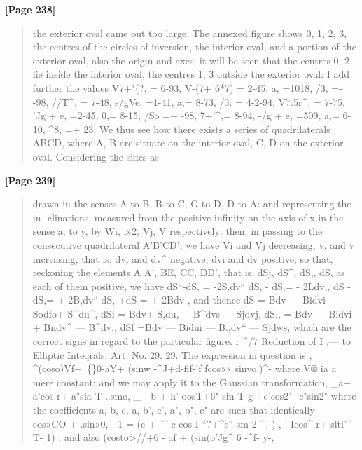 \documentclass[11pt,a4paper]{book}
\begin{document}
\textbf{[Page 238]}\\[0.2cm]
\begin{quote}
the exterior oval came out too large. The annexed figure shows 0, 1, 2, 3, the
centres of the circles of inversion, the interior oval, and a portion of the exterior
oval, also the origin and axes; it will be seen that the centres 0, 2 lie inside the
interior oval, the centres 1, 3 outside the exterior oval: I add further the values
V7+"(?, = 6-93, V-(7+ 6*7) = 2-45, a, =1018, /3, =- -98,
//T\textasciicircum{}, = 7-48, s/gVe, =1-41, a,= 8-73, /3: = 4-2-94,
V7:5r\textasciicircum{}. = 7-75, 'Jg + e, =2-45, 0,= 8-15, /So =+ -98,
7+'\textasciicircum{},= 8-94, -/g + e, =509, a,= 6-10, \textasciicircum{}8, =+ 23.
We thus see how there exists a series of quadrilaterals ABCD, where A, B are
situate on the interior oval, C, D on the exterior oval. Considering the sides as
\end{quote}

\textbf{[Page 239]}\\[0.2cm]
\begin{quote}
drawn in the senses A to B, B to C, G to D, D to A: and representing the in-
clinations, measured from the positive infinity on the axis of x in the sense a; to y,
by Wi, i»2, Vj, V respectively: then, in passing to the consecutive quadrilateral A'B'CD',
we have Vi and Vj decreasing, v, and v increasing, that is, dvi and dv\textasciicircum{} negative, dvi
and dv positive; so that, reckoning the elements A A', BE, CC, DD', that is, dSj, dS\textasciicircum{},
dS,, dS, as each of them positive, we have
dS``-dS, = -2S,dv``
dS, - dS,= - 2Ldv,,
dS -dS,= + 2B,dv``
dS, +dS = + 2Bdv
,
and thence
dS = Bdv --- Bidvi --- Sodfo+ S\textasciicircum{}du\textasciicircum{},
dSi = Bdv+ S,du, + B\textasciicircum{}dvs --- Sjdvj,
dS., = Bdv --- Bidvi + Bndv\textasciicircum{} --- B\textasciicircum{}dv,,
dSf
=Bdv ---
Bidui
---
B.,dv``
---
Sjdws,
which are the correct signs in regard to the particular figure.
r \textasciicircum{}/7
Reduction of I ,--- to Elliptic Inteqrals. Art. No. 29.
29. The expression in question is
,
\textasciicircum{}(coso)Vf+~\{\}0-aY+ (sinw -\textasciicircum{}J+d-fif-'f
fcos»« sinvo,)\textasciicircum{}-
where V® ia a mere constant; and we may apply it to the Gaussian transformation,
\_a+ a'cos r+ a"sia T
..smo, \_ - b + h' oosT+6" sin T
g
+c'cos2'+c"sin2"
where the coefficients a, b, c, a, b', c', a", b", c" are such that identically
---
cos»CO + .sin»0, - 1 = (c + -\textasciicircum{} c cos I ``?+\textasciicircum{}c`` sm 2 \textasciicircum{}, ) , ' Icos\textasciicircum{} r+ siti'\textasciicircum{} T- 1) :
and also
(costo>//+6
-
af + (sin(o'Jg\textasciicircum{} 6
-\textasciicircum{}f-
y-,
\end{quote}
\end{document}

